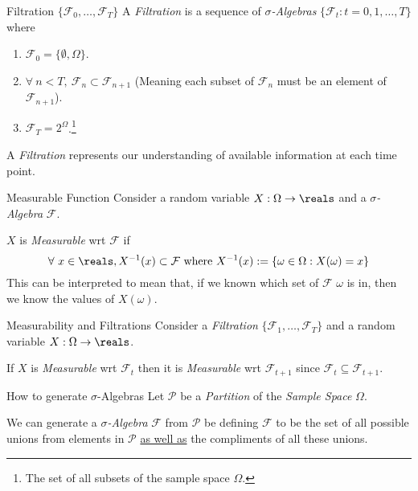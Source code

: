 \documentclass[11pt,a4paper]{article}
\begin{document}
  \begin{definition}{Filtration $\{\mathcal{F}_0,\dots,\mathcal{F}_T\}$}
    A \textit{Filtration} is a sequence of \textit{$\sigma$-Algebras} $\{\mathcal{F}_t:t=0,1,\dots,T\}$ where
    \begin{enumerate}
      \item $\mathcal{F}_0=\{\emptyset,\Omega\}$.
      \item $\forall\ n<T,\ \mathcal{F}_n\subset\mathcal{F}_{n+1}$ (Meaning each subset of $\mathcal{F}_n$ must be an element of $\mathcal{F}_{n+1}$).
      \item $\mathcal{F}_T=2^\Omega$.\footnote{The set of all subsets of the sample space $\Omega$.}
    \end{enumerate}
    A \textit{Filtration} represents our understanding of available information at each time point.
  \end{definition}

  \begin{definition}{Measurable Function}
    Consider a random variable $X:\Omega\to\reals$ and a \textit{$\sigma$-Algebra} $\mathcal{F}$.
    \par $X$ is \textit{Measurable} wrt $\mathcal{F}$ if
    \[ \forall\ x\in\reals, X^{-1}(x)\subset\mathcal{F}\text{ where }X^{-1}(x):=\{\omega\in\Omega:X(\omega)=x\} \]
    This can be interpreted to mean that, if we known which set of $\mathcal{F}$ $\omega$ is in, then we know the values of $X(\omega)$.
  \end{definition}

  \begin{proposition}{Measurability and Filtrations}
    Consider a \textit{Filtration} $\{\mathcal{F}_1,\dots,\mathcal{F}_T\}$ and a random variable $X:\Omega\to\reals$.
    \par If $X$ is \textit{Measurable} wrt $\mathcal{F}_t$ then it is \textit{Measurable} wrt $\mathcal{F}_{t+1}$ since $\mathcal{F}_t\subseteq\mathcal{F}_{t+1}$.
  \end{proposition}

  \begin{proposition}{How to generate $\sigma$-Algebras}\label{prop_generate_sigma_algebras}
    Let $\mathcal{P}$ be a \textit{Partition} of the \textit{Sample Space} $\Omega$.
    \par We can generate a \textit{$\sigma$-Algebra} $\mathcal{F}$ from $\mathcal{P}$ be defining $\mathcal{F}$ to be the set of all possible unions from elements in $\mathcal{P}$ \underline{as well as} the compliments of all these unions.
  \end{proposition}
\end{document}
